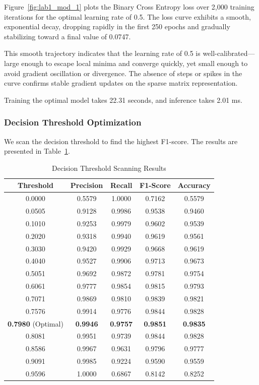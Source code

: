 \documentclass[12pt,a4paper]{article}
\begin{document}
Figure~\ref{fig:lab1_mod_1} plots the Binary Cross Entropy loss over 2,000 training iterations for the optimal learning rate of 0.5. The loss curve exhibits a smooth, exponential decay, dropping rapidly in the first 250 epochs and gradually stabilizing toward a final value of 0.0747. 

This smooth trajectory indicates that the learning rate of 0.5 is well-calibrated—large enough to escape local minima and converge quickly, yet small enough to avoid gradient oscillation or divergence. The absence of steps or spikes in the curve confirms stable gradient updates on the sparse matrix representation.

Training the optimal model takes 22.31 seconds, and inference takes 2.01 ms.

\subsubsection{Decision Threshold Optimization}
We scan the decision threshold to find the highest F1-score. The results are presented in Table~\ref{tab:thresholds}.
\begin{table}[H]
\centering
\caption{Decision Threshold Scanning Results}
\label{tab:thresholds}
\begin{tabular}{ccccc}
\toprule
\textbf{Threshold} & \textbf{Precision} & \textbf{Recall} & \textbf{F1-Score} & \textbf{Accuracy} \\
\midrule
0.0000 & 0.5579 & 1.0000 & 0.7162 & 0.5579 \\
0.0505 & 0.9128 & 0.9986 & 0.9538 & 0.9460 \\
0.1010 & 0.9253 & 0.9979 & 0.9602 & 0.9539 \\
0.2020 & 0.9318 & 0.9940 & 0.9619 & 0.9561 \\
0.3030 & 0.9420 & 0.9929 & 0.9668 & 0.9619 \\
0.4040 & 0.9527 & 0.9906 & 0.9713 & 0.9673 \\
0.5051 & 0.9692 & 0.9872 & 0.9781 & 0.9754 \\
0.6061 & 0.9777 & 0.9854 & 0.9815 & 0.9793 \\
0.7071 & 0.9869 & 0.9810 & 0.9839 & 0.9821 \\
0.7576 & 0.9914 & 0.9776 & 0.9844 & 0.9828 \\
\textbf{0.7980} (Optimal) & \textbf{0.9946} & \textbf{0.9757} & \textbf{0.9851} & \textbf{0.9835} \\
0.8081 & 0.9951 & 0.9739 & 0.9844 & 0.9828 \\
0.8586 & 0.9967 & 0.9631 & 0.9796 & 0.9777 \\
0.9091 & 0.9985 & 0.9224 & 0.9590 & 0.9559 \\
0.9596 & 1.0000 & 0.6867 & 0.8142 & 0.8252 \\
\bottomrule
\end{tabular}
\end{table}
\end{document}
